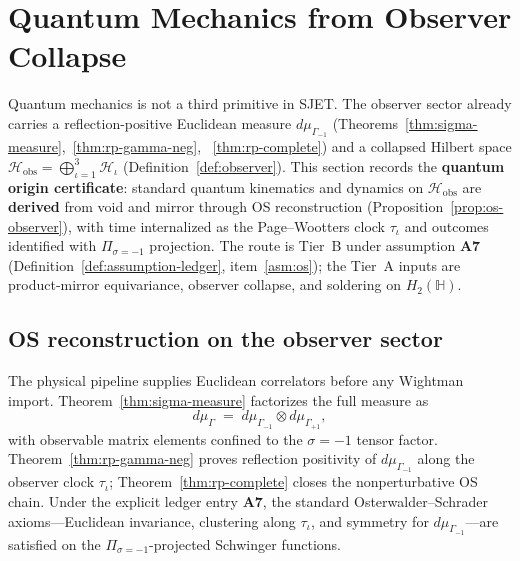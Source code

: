 \documentclass[11pt]{article}
\theoremstyle{plain}
\theoremstyle{definition}
\theoremstyle{remark}
\numberwithin{equation}{section}
\newcommand{\Quat}{\mathbb{H}}
\begin{document}
\section{Quantum Mechanics from Observer Collapse}
\label{sec:quantum-origin}

Quantum mechanics is not a third primitive in SJET. The observer sector
already carries a reflection-positive Euclidean measure $d\mu_{\Gamma_{-1}}$
(Theorems~\ref{thm:sigma-measure},~\ref{thm:rp-gamma-neg},
~\ref{thm:rp-complete}) and a collapsed Hilbert space
$\mathcal{H}_{\mathrm{obs}}=\bigoplus_{\iota=1}^3\mathcal{H}_\iota$
(Definition~\ref{def:observer}). This section records the \textbf{quantum
origin certificate}: standard quantum kinematics and dynamics on
$\mathcal{H}_{\mathrm{obs}}$ are \textbf{derived} from void and mirror through
OS reconstruction (Proposition~\ref{prop:os-observer}), with time internalized
as the Page--Wootters clock $\tau_\iota$ and outcomes identified with
$\Pi_{\sigma=-1}$ projection. The route is Tier~B under assumption
\textbf{A7} (Definition~\ref{def:assumption-ledger}, item~\ref{asm:os}); the
Tier~A inputs are product-mirror equivariance, observer collapse, and soldering
on $H_2(\Quat)$.

\subsection{OS reconstruction on the observer sector}

The physical pipeline supplies Euclidean correlators before any Wightman
import. Theorem~\ref{thm:sigma-measure} factorizes the full measure as
\begin{equation}\label{eq:qm-gamma-split}
  d\mu_\Gamma
  \;=\;
  d\mu_{\Gamma_{-1}}\otimes d\mu_{\Gamma_{+1}},
\end{equation}
with observable matrix elements confined to the $\sigma=-1$ tensor factor.
Theorem~\ref{thm:rp-gamma-neg} proves reflection positivity of
$d\mu_{\Gamma_{-1}}$ along the observer clock $\tau_\iota$; Theorem~\ref{thm:rp-complete}
closes the nonperturbative OS chain. Under the explicit ledger entry
\textbf{A7}, the standard Osterwalder--Schrader axioms---Euclidean invariance,
clustering along $\tau_\iota$, and symmetry for $d\mu_{\Gamma_{-1}}$---are
satisfied on the $\Pi_{\sigma=-1}$-projected Schwinger functions.
\end{document}
